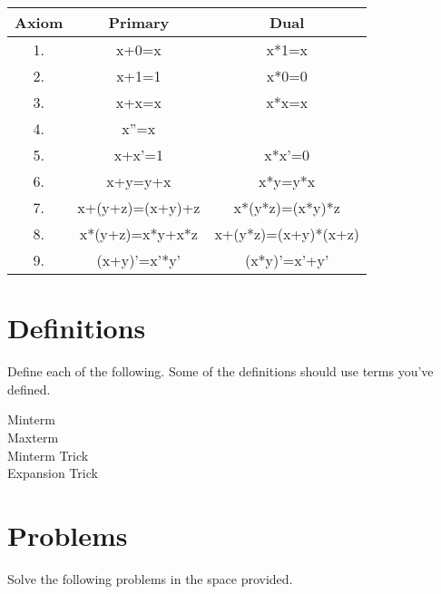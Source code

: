 \vspace{0.2in}

\begin{tabular}[ht]{|c|c|c|}\hline
    Axiom    &    Primary &    Dual    \\ \hline
    1.    &    x+0=x    &    x*1=x    \\ \hline
    2.    &    x+1=1    &    x*0=0    \\ \hline
    3.    &    x+x=x    &    x*x=x    \\ \hline
    4.    &    x''=x    &             \\ \hline
    5.    &    x+x'=1    &    x*x'=0    \\ \hline
    6.    &    x+y=y+x    &    x*y=y*x\\ \hline
    7.    & x+(y+z)=(x+y)+z&x*(y*z)=(x*y)*z \\ \hline
    8.    & x*(y+z)=x*y+x*z  & x+(y*z)=(x+y)*(x+z)  \\ \hline
    9.    & (x+y)'=x'*y'  & (x*y)'=x'+y' \\ \hline
\end{tabular}

\section{Definitions}
Define each of the following. Some of the definitions should use terms you've defined.
\begin{description}
    \item[Minterm]
    \item[Maxterm]
    \item[Minterm Trick]
    \item[Expansion Trick]
\end{description}

\section{Problems}
Solve the following problems in the space provided.


